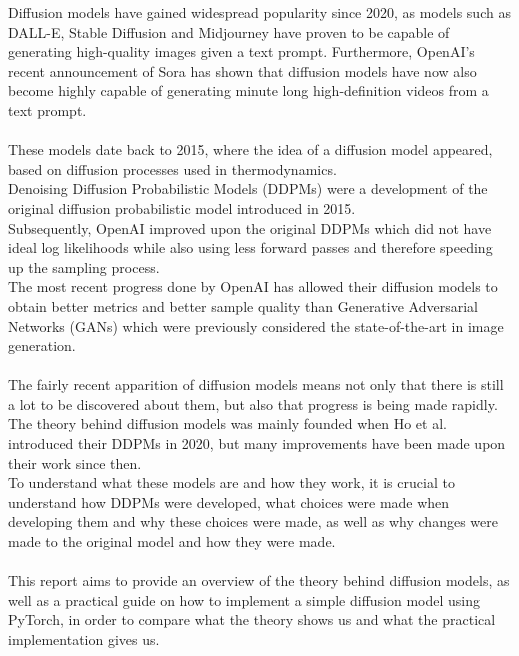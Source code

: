 \documentclass{article}
\begin{document}
Diffusion models have gained widespread popularity since 2020, as models such as DALL-E, Stable Diffusion and Midjourney have proven to be capable of generating high-quality images given a text prompt. Furthermore, OpenAI's recent announcement of Sora has shown that diffusion models have now also become highly capable of generating minute long high-definition videos from a text prompt. \cite{videoworldsimulators2024}
\\\\
These models date back to 2015, where the idea of a diffusion model appeared, based on diffusion processes used in thermodynamics. \cite{sohldickstein2015deep} \\
Denoising Diffusion Probabilistic Models (DDPMs) were a development of the original diffusion probabilistic model introduced in 2015. \cite{ho2020denoising} \\
Subsequently, OpenAI improved upon the original DDPMs which did not have ideal log likelihoods \cite{ho2020denoising} while also using less forward passes and therefore speeding up the sampling process. \cite{nichol2021improved} \\
The most recent progress done by OpenAI has allowed their diffusion models to obtain better metrics and better sample quality than Generative Adversarial Networks (GANs) which were previously considered the state-of-the-art in image generation. \cite{dhariwal2021diffusion}
\\\\
The fairly recent apparition of diffusion models means not only that there is still a lot to be discovered about them, but also that progress is being made rapidly. \\
The theory behind diffusion models was mainly founded when Ho et al. \cite{ho2020denoising} introduced their DDPMs in 2020, but many improvements have been made upon their work since then. \\ 
To understand what these models are and how they work, it is crucial to understand how DDPMs were developed, what choices were made when developing them and why these choices were made, as well as why changes were made to the original model and how they were made.
\\\\
This report aims to provide an overview of the theory behind diffusion models, as well as a practical guide on how to implement a simple diffusion model using PyTorch, in order to compare what the theory shows us and what the practical implementation gives us.
\end{document}
